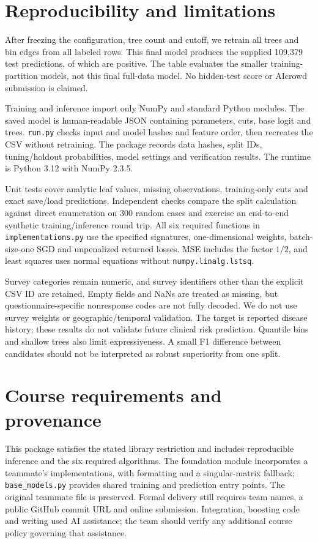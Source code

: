 \documentclass[10pt,a4paper]{article}
\begin{document}
\section{Reproducibility and limitations}
After freezing the configuration, tree count and cutoff, we retrain all trees and bin edges from all labeled rows. This final model produces the supplied 109,379 test predictions, of which \TestPositive{} are positive. The table evaluates the smaller training-partition models, not this final full-data model. No hidden-test score or AIcrowd submission is claimed.

Training and inference import only NumPy and standard Python modules. The saved model is human-readable JSON containing parameters, cuts, base logit and trees. \texttt{run.py} checks input and model hashes and feature order, then recreates the CSV without retraining. The package records data hashes, split IDs, tuning/holdout probabilities, model settings and verification results. The runtime is Python 3.12 with NumPy 2.3.5.

Unit tests cover analytic leaf values, missing observations, training-only cuts and exact save/load predictions. Independent checks compare the split calculation against direct enumeration on 300 random cases and exercise an end-to-end synthetic training/inference round trip. All six required functions in \texttt{implementations.py} use the specified signatures, one-dimensional weights, batch-size-one SGD and unpenalized returned losses. MSE includes the factor $1/2$, and least squares uses normal equations without \texttt{numpy.linalg.lstsq}.

Survey categories remain numeric, and survey identifiers other than the explicit CSV ID are retained. Empty fields and NaNs are treated as missing, but questionnaire-specific nonresponse codes are not fully decoded. We do not use survey weights or geographic/temporal validation. The target is reported disease history; these results do not validate future clinical risk prediction. Quantile bins and shallow trees also limit expressiveness. A small F1 difference between candidates should not be interpreted as robust superiority from one split.

\section{Course requirements and provenance}
This package satisfies the stated library restriction and includes reproducible inference and the six required algorithms. The foundation module incorporates a teammate's implementations, with formatting and a singular-matrix fallback; \texttt{base\_models.py} provides shared training and prediction entry points. The original teammate file is preserved. Formal delivery still requires team names, a public GitHub commit URL and online submission. Integration, boosting code and writing used AI assistance; the team should verify any additional course policy governing that assistance.
\end{document}
